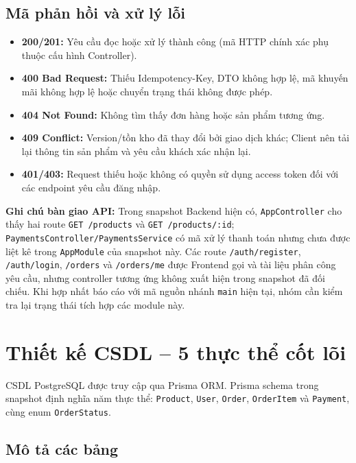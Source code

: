 \subsection{Mã phản hồi và xử lý lỗi}

\begin{itemize}
    \item \textbf{200/201:} Yêu cầu đọc hoặc xử lý thành công (mã HTTP chính xác phụ thuộc cấu hình Controller).
    \item \textbf{400 Bad Request:} Thiếu Idempotency-Key, DTO không hợp lệ, mã khuyến mãi không hợp lệ hoặc chuyển trạng thái không được phép.
    \item \textbf{404 Not Found:} Không tìm thấy đơn hàng hoặc sản phẩm tương ứng.
    \item \textbf{409 Conflict:} Version/tồn kho đã thay đổi bởi giao dịch khác; Client nên tải lại thông tin sản phẩm và yêu cầu khách xác nhận lại.
    \item \textbf{401/403:} Request thiếu hoặc không có quyền sử dụng access token đối với các endpoint yêu cầu đăng nhập.
\end{itemize}

\textbf{Ghi chú bàn giao API:} Trong snapshot Backend hiện có, \texttt{AppController} cho thấy hai route \texttt{GET /products} và \texttt{GET /products/:id}; \texttt{PaymentsController/PaymentsService} có mã xử lý thanh toán nhưng chưa được liệt kê trong \texttt{AppModule} của snapshot này. Các route \texttt{/auth/register}, \texttt{/auth/login}, \texttt{/orders} và \texttt{/orders/me} được Frontend gọi và tài liệu phân công yêu cầu, nhưng controller tương ứng không xuất hiện trong snapshot đã đối chiếu. Khi hợp nhất báo cáo với mã nguồn nhánh \texttt{main} hiện tại, nhóm cần kiểm tra lại trạng thái tích hợp các module này.

\section{Thiết kế CSDL -- 5 thực thể cốt lõi}
\label{sec:database-entities}

CSDL PostgreSQL được truy cập qua Prisma ORM. Prisma schema trong snapshot định nghĩa năm thực thể: \texttt{Product}, \texttt{User}, \texttt{Order}, \texttt{OrderItem} và \texttt{Payment}, cùng enum \texttt{OrderStatus}.

\subsection{Mô tả các bảng}


